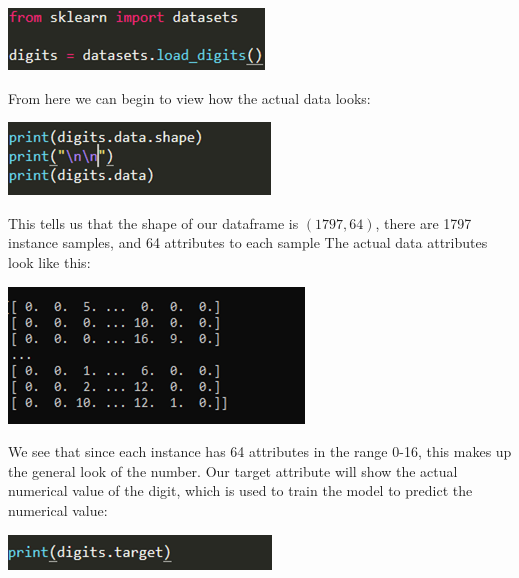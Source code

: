 \documentclass[a4paper,12pt]{report}
\begin{document}
\begin{center}
    \captionsetup{type=figure}
    \includegraphics[width=.5\linewidth]{media/loadDidgit.png}
\end{center}

From here we can  begin to view how the actual data looks:

\begin{center}
    \captionsetup{type=figure}
    \includegraphics[width=.5\linewidth]{media/digitprintpng.png}
\end{center}

This tells us that the shape of our dataframe is $(1797, 64)$, there are 1797 instance samples, and 64 attributes to each sample
The actual data attributes look like this:

\begin{center}
    \captionsetup{type=figure}
    \includegraphics[width=.5\linewidth]{media/digitarrays.png}
\end{center}

We see that since each instance has 64 attributes in the range 0-16, this makes up the general look of the number. Our target attribute will show the actual numerical value of the digit, which is used to train the model to predict the numerical value:

\begin{center}
    \captionsetup{type=figure}
    \includegraphics[width=.5\linewidth]{media/printdigits.png}
\end{center}
\end{document}
